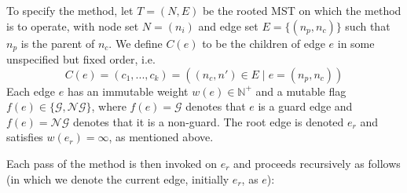 \documentclass[preprint,a4paper]{elsarticle}
\begin{document}
To specify the method, let $T = (N,E)$ be the rooted MST on which the method is to operate, with node set $N = (n_i)$ and edge set $E = \{(n_p,n_c)\}$ such that $n_p$ is the parent of $n_c$. We define $C(e)$ to be the children of edge $e$ in some unspecified but fixed order, i.e.
%
\[
C(e) = (c_1,...,c_k) = ((n_c,n') \in E \; | \; e = (n_p,n_c))
\]
%
Each edge $e$ has an immutable weight $w(e) \in \mathbb{N}^+$ and a mutable flag $f(e) \in \{\mathcal{G},\mathcal{NG}\}$, where $f(e) = \mathcal{G}$ denotes that $e$ is a guard edge and $f(e) = \mathcal{NG}$ denotes that it is a non-guard. The root edge is denoted $e_r$ and satisfies $w(e_r) = \infty$, as mentioned above.

Each pass of the method is then invoked on $e_r$ and proceeds recursively as follows (in which we denote the current edge, initially $e_r$, as $e$):
%
\end{document}

